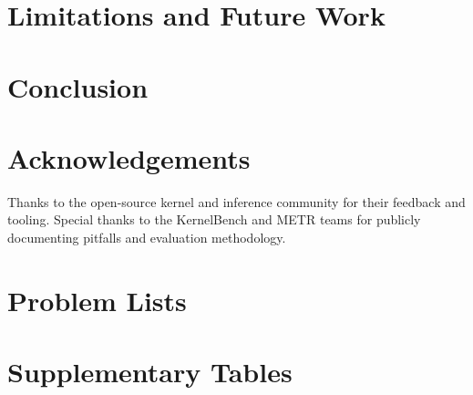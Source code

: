 \documentclass{article}
\begin{document}
\section{Limitations and Future Work}


\section{Conclusion}


\section*{Acknowledgements}
Thanks to the open-source kernel and inference community for their feedback and tooling. Special thanks to the KernelBench and METR teams for publicly documenting pitfalls and evaluation methodology.




\newpage
\appendix

\section{Problem Lists}


\section{Supplementary Tables}

\end{document}
